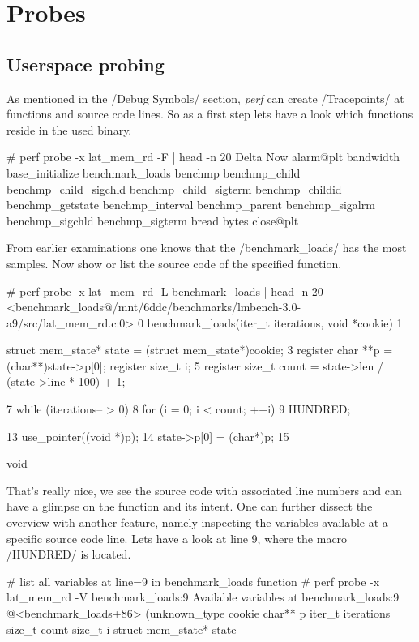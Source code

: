 \chapter{Probes}
\section{Userspace probing}

As mentioned in the /Debug Symbols/ section, {\em perf} can create
/Tracepoints/ at functions and source code lines. So as a first
step lets have a look which functions reside in the used binary.

\starttyping
# perf probe -x lat_mem_rd -F | head -n 20
Delta
Now
alarm@plt
bandwidth
base_initialize
benchmark_loads
benchmp
benchmp_child
benchmp_child_sigchld
benchmp_child_sigterm
benchmp_childid
benchmp_getstate
benchmp_interval
benchmp_parent
benchmp_sigalrm
benchmp_sigchld
benchmp_sigterm
bread
bytes
close@plt
\stoptyping

From earlier examinations one knows that the /benchmark_loads/ has the most
samples. Now show or list the source code of the specified function.

\starttyping
# perf probe -x lat_mem_rd -L benchmark_loads | head -n 20
<benchmark_loads@/mnt/6ddc/benchmarks/lmbench-3.0-a9/src/lat_mem_rd.c:0>
      0  benchmark_loads(iter_t iterations, void *cookie)
      1  {
         	struct mem_state* state = (struct mem_state*)cookie;
      3  	register char **p = (char**)state->p[0];
         	register size_t i;
      5  	register size_t count = state->len / (state->line * 100) + 1;

      7  	while (iterations-- > 0) {
      8  		for (i = 0; i < count; ++i) {
      9  			HUNDRED;
         		}
         	}

     13  	use_pointer((void *)p);
     14  	state->p[0] = (char*)p;
     15  }


         void
\stoptyping

That's really nice, we see the source code with associated line
numbers and can have a glimpse on the function and its intent. One can
further dissect the overview with another feature, namely inspecting
the variables available at a specific source code line. Lets have a
look at line 9, where the macro /HUNDRED/ is located.

\starttyping
# list all variables at line=9 in benchmark_loads function
# perf probe -x lat_mem_rd -V benchmark_loads:9
Available variables at benchmark_loads:9
	@<benchmark_loads+86>
		 (unknown_type	cookie
		char**	p
		iter_t	iterations
		size_t	count
		size_t	i
		struct mem_state*	state
\stoptyping

